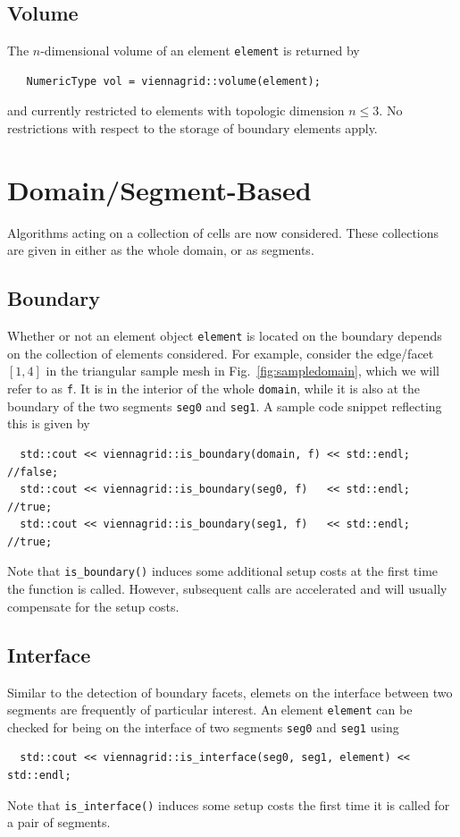   \subsection{Volume}
  The $n$-dimensional volume of an element \lstinline|element| is returned by
  \begin{lstlisting}
   NumericType vol = viennagrid::volume(element);
  \end{lstlisting}
  and currently restricted to elements with topologic dimension $n \leq 3$. No restrictions with respect to the storage of boundary elements apply.


\section{Domain/Segment-Based}
Algorithms acting on a collection of cells are now considered. These collections are given in {\ViennaGrid} either as the whole domain, or as segments.

 \subsection{Boundary}
 Whether or not an element object \lstinline|element| is located on the boundary depends on the collection of elements considered.
 For example, consider the edge/facet $[1,4]$ in the triangular sample mesh in Fig.~\ref{fig:sampledomain}, which we will refer to as \lstinline|f|.
 It is in the interior of the whole \lstinline|domain|, while it is also at the boundary of the two segments \lstinline|seg0| and \lstinline|seg1|.
 A sample code snippet reflecting this is given by
 \begin{lstlisting}
  std::cout << viennagrid::is_boundary(domain, f) << std::endl; //false;
  std::cout << viennagrid::is_boundary(seg0, f)   << std::endl; //true;
  std::cout << viennagrid::is_boundary(seg1, f)   << std::endl; //true;
 \end{lstlisting}
 Note that \lstinline|is_boundary()| induces some additional setup costs at the first time the function is called. However, subsequent calls are accelerated and will usually compensate for the setup costs.

 

 \subsection{Interface}
  Similar to the detection of boundary facets, elemets on the interface between two segments are frequently of particular interest. 
  An element \lstinline|element| can be checked for being on the interface of two segments \lstinline|seg0| and \lstinline|seg1| using
 \begin{lstlisting}
  std::cout << viennagrid::is_interface(seg0, seg1, element) << std::endl;
 \end{lstlisting}
 Note that \lstinline|is_interface()| induces some setup costs the first time it is called for a pair of segments.

